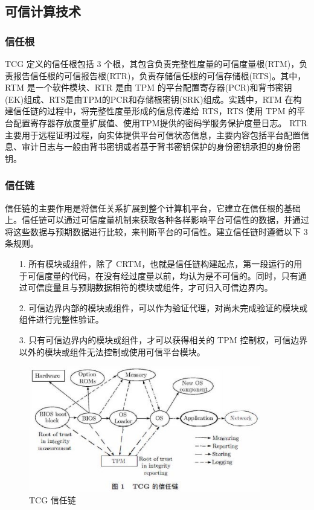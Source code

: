 \subsection{可信计算技术}

\subsubsection{信任根}

TCG 定义的信任根包括 3 个根，其包含负责完整性度量的可信度量根(RTM)，负责报告信任根的可信报告根(RTR)，负责存储信任根的可信存储根(RTS)。其中，RTM 是一个软件模块、RTR 是由 TPM 的平台配置寄存器(PCR)和背书密钥(EK)组成、RTS是由TPM的PCR和存储根密钥(SRK)组成。实践中，RTM 在构建信任链的过程中，将完整性度量形成的信息传递给 RTS，RTS 使用 TPM 的平台配置寄存器存放度量扩展值、使用TPM提供的密码学服务保护度量日志。 RTR 主要用于远程证明过程，向实体提供平台可信状态信息，主要内容包括平台配置信息、审计日志与一般由背书密钥或者基于背书密钥保护的身份密钥承担的身份密钥。

\subsubsection{信任链}

信任链的主要作用是将信任关系扩展到整个计算机平台，它建立在信任根的基础上。信任链可以通过可信度量机制来获取各种各样影响平台可信性的数据，并通过将这些数据与预期数据进行比较，来判断平台的可信性。建立信任链时遵循以下 3 条规则。

\begin{itemize}
\item [1.] 所有模块或组件，除了 CRTM，也就是信任链构建起点，第一段运行的用于可信度量的代码，在没有经过度量以前，均认为是不可信的。同时，只有通过可信度量且与预期数据相符的模块或组件，才可归入可信边界内。
\item [2.] 可信边界内部的模块或组件，可以作为验证代理，对尚未完成验证的模块或组件进行完整性验证。
\item [3.] 只有可信边界内的模块或组件，才可以获得相关的 TPM 控制权，可信边界以外的模块或组件无法控制或使用可信平台模块。
\end{itemize}

\begin{figure}[htb]
\centering 
\includegraphics[width=0.90\textwidth]{img/ch3m1.jpg} 
\caption{TCG 信任链}
\label{Test}
\end{figure}

